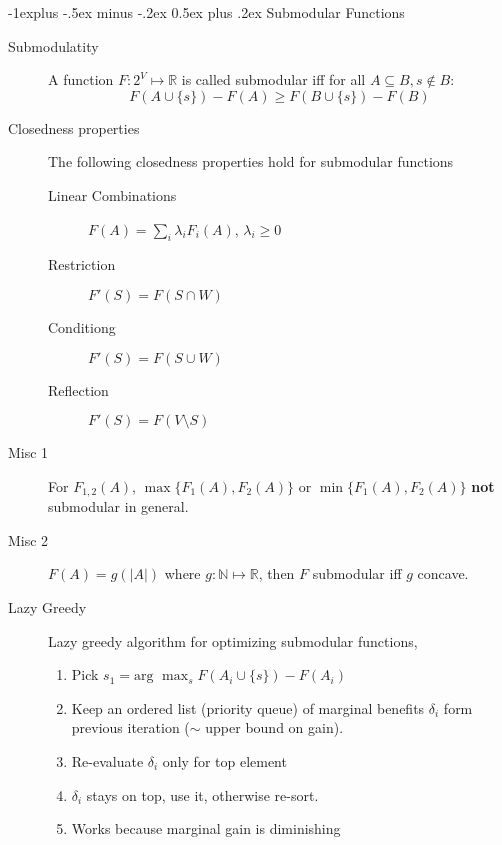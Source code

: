 \documentclass[11pt,landscape]{article}
\makeatletter
\renewcommand{\subsection}{\@startsection{subsection}{2}{0mm}%
                                {-1explus -.5ex minus -.2ex}%
                                {0.5ex plus .2ex}%
                                {\normalfont\normalsize\bfseries}}
\makeatother
\begin{document}
\begin{multicols}{3}
\subsection{Submodular Functions}
\begin{description}
    \item[Submodulatity] A function $F: 2^V \mapsto \mathbb{R}$ is called submodular iff for all $A \subseteq B, s \notin B$:
        $$F(A \cup \{s\}) - F(A) \geq F(B \cup \{s\}) - F(B)$$
    \item[Closedness properties] The following closedness properties hold for submodular functions
    \begin{description}
        \item[Linear Combinations] $F(A) = \sum_{i} \lambda_i F_i(A)$, $\lambda_i \geq 0$ 
        \item[Restriction] $F'(S) = F(S \cap W)$ 
        \item[Conditiong] $F'(S) = F(S \cup W)$
        \item[Reflection] $F'(S) = F(V \setminus S)$ 
    \end{description}
    \item[Misc 1]For $F_{1,2}(A)$, $\max \{F_1(A),F_2(A) \}$ or $\min \{F_1(A),F_2(A) \}$ \textbf{not} submodular in general.
    \item[Misc 2]
    $F(A) = g(|A|)$ where $g: \mathbb{N} \mapsto \mathbb{R}$, then $F$ submodular iff $g$ concave.
    \item[Lazy Greedy]
    
Lazy greedy algorithm for optimizing submodular functions, 
\begin{enumerate}
    \item Pick $s_1 = \text{arg } \max_s F(A_i \cup \{s\}) - F(A_i)$
    \item Keep an ordered list (priority queue) of marginal benefits $\delta_i$ form previous iteration ($\sim$ upper bound on gain).
    \item Re-evaluate $\delta_i$ only for top element
    \item $\delta_i$ stays on top, use it, otherwise re-sort. 
    \item Works because marginal gain is diminishing
\end{enumerate}
\end{description}


\end{multicols}

\end{document}
